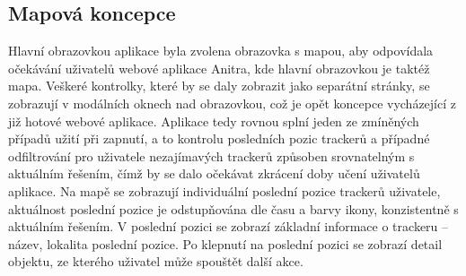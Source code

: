 \subsection{Mapová koncepce}

Hlavní obrazovkou aplikace byla zvolena obrazovka s mapou, aby odpovídala očekávání uživatelů webové aplikace Anitra, kde hlavní obrazovkou je taktéž mapa. Veškeré kontrolky, které by se daly zobrazit jako separátní stránky, se zobrazují v modálních oknech nad obrazovkou, což je opět koncepce vycházející z již hotové webové aplikace. Aplikace tedy rovnou splní jeden ze zmíněných případů užití při zapnutí, a to kontrolu posledních pozic trackerů a případné odfiltrování pro uživatele nezajímavých trackerů způsoben srovnatelným s aktuálním řešením, čímž by se dalo očekávat zkrácení doby učení uživatelů aplikace. Na mapě se zobrazují individuální poslední pozice trackerů uživatele, aktuálnost poslední pozice je odstupňována dle času a barvy ikony, konzistentně s aktuálním řešením. V poslední pozici se zobrazí základní informace o trackeru -- název, lokalita poslední pozice. Po klepnutí na poslední pozici se zobrazí detail objektu, ze kterého uživatel může spouštět další akce.


